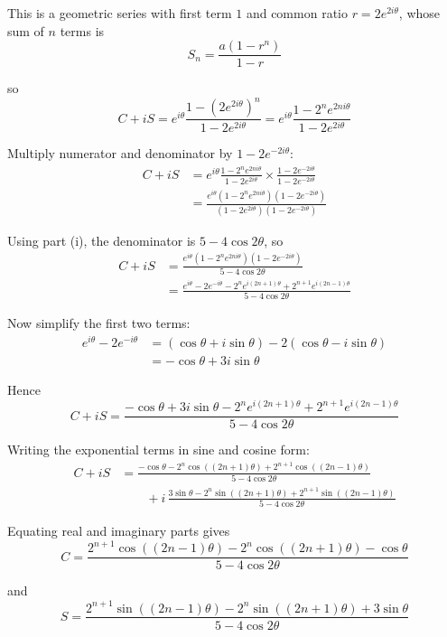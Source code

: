 \documentclass[leqno]{article}
\begin{document}
\begin{enumerate}[
  label=\textbf{\arabic*.},
  leftmargin=*,
  topsep=0pt,
  partopsep=0pt,
  parsep=0pt
]
\begin{djsSolution}
\begin{enumerate}[label=\textbf{(\roman*)}]
  This is a geometric series with first term $1$ and common ratio $r=2e^{2i\theta}$, whose sum of $n$ terms is
  \[
  S_n=\dfrac{a(1-r^n)}{1-r}
  \]

  so
  \[
  C+iS=e^{i\theta}\frac{1-(2e^{2i\theta})^n}{1-2e^{2i\theta}}
  =e^{i\theta}\frac{1-2^n e^{2ni\theta}}{1-2e^{2i\theta}}
  \]

  Multiply numerator and denominator by $1-2e^{-2i\theta}$:
  \begin{align*}
  C+iS&=e^{i\theta}\frac{1-2^n e^{2ni\theta}}{1-2e^{2i\theta}}\times\frac{1-2e^{-2i\theta}}{1-2e^{-2i\theta}}\\
  &=\frac{e^{i\theta}(1-2^n e^{2ni\theta})(1-2e^{-2i\theta})}{(1-2e^{2i\theta})(1-2e^{-2i\theta})}
  \end{align*}

  Using part (i), the denominator is $5-4\cos2\theta$, so
  \begin{align*}
  C+iS&=\frac{e^{i\theta}(1-2^n e^{2ni\theta})(1-2e^{-2i\theta})}{5-4\cos2\theta}\\
  &=\frac{e^{i\theta}-2e^{-i\theta}-2^n e^{i(2n+1)\theta}+2^{n+1}e^{i(2n-1)\theta}}{5-4\cos2\theta}
  \end{align*}

  Now simplify the first two terms:
  \begin{align*}
  e^{i\theta}-2e^{-i\theta}
  &=(\cos\theta+i\sin\theta)-2(\cos\theta-i\sin\theta)\\
  &=-\cos\theta+3i\sin\theta
  \end{align*}

  Hence
  \[
  C+iS=\frac{-\cos\theta+3i\sin\theta-2^n e^{i(2n+1)\theta}+2^{n+1}e^{i(2n-1)\theta}}{5-4\cos2\theta}
  \]

  Writing the exponential terms in sine and cosine form:
  \begin{align*}
  C+iS
  &=\frac{-\cos\theta-2^n\cos((2n+1)\theta)+2^{n+1}\cos((2n-1)\theta)}{5-4\cos2\theta}\\
  &\qquad+i\,\frac{3\sin\theta-2^n\sin((2n+1)\theta)+2^{n+1}\sin((2n-1)\theta)}{5-4\cos2\theta}
  \end{align*}

  Equating real and imaginary parts gives
  \[
  C=\frac{2^{n+1}\cos((2n-1)\theta)-2^n\cos((2n+1)\theta)-\cos\theta}{5-4\cos2\theta}
  \]

  and
  \[
  S=\frac{2^{n+1}\sin((2n-1)\theta)-2^n\sin((2n+1)\theta)+3\sin\theta}{5-4\cos2\theta}
  \]
\end{enumerate}
\end{djsSolution}



\end{enumerate}
\end{document}
